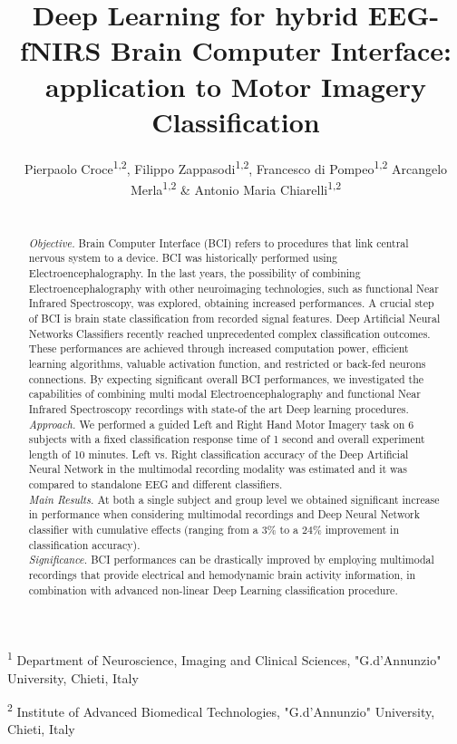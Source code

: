 \documentclass[12pt ]{iopart}
\begin{document}
\title[DNN for EEG-fNIRS BCI]{Deep Learning for  hybrid EEG-fNIRS Brain Computer Interface: application to Motor Imagery Classification}

\author{Pierpaolo Croce\textsuperscript{1,2}, Filippo Zappasodi\textsuperscript{1,2}, Francesco di Pompeo\textsuperscript{1,2} Arcangelo Merla\textsuperscript{1,2} \& Antonio Maria Chiarelli\textsuperscript{1,2}}

\vspace{10pt}
\begin{indented}
\item[] \textsuperscript{1} Department of Neuroscience, Imaging and Clinical Sciences, "G.d’Annunzio" University, Chieti, Italy
\item[] \textsuperscript{2} Institute of Advanced Biomedical Technologies, "G.d’Annunzio" University, Chieti, Italy
\end{indented}

\begin{abstract}
	\\
	\textit{Objective.} Brain Computer Interface (BCI) refers to procedures that link central nervous system to a device.  BCI was historically performed using Electroencephalography. In the last years, the possibility of combining Electroencephalography with other neuroimaging technologies, such as functional Near Infrared Spectroscopy, was explored, obtaining increased performances. A crucial step of BCI is brain state classification from recorded signal features. Deep Artificial Neural Networks Classifiers recently reached unprecedented complex classification outcomes. These performances are achieved through increased computation power, efficient learning algorithms, valuable activation function, and restricted or back-fed neurons connections. By expecting significant overall BCI performances, we investigated the capabilities of combining multi modal Electroencephalography and functional Near Infrared Spectroscopy recordings with state-of the art Deep learning procedures.\\
	\textit{Approach.} We performed a guided Left and Right Hand Motor Imagery task on 6 subjects with a fixed classification response time of 1 second and overall experiment length of 10 minutes. Left vs. Right classification accuracy of the Deep Artificial Neural Network in the multimodal recording modality was estimated and it was compared to standalone EEG and different classifiers.\\
	\textit{Main Results.} At both a single subject and group level we obtained significant increase in performance when considering multimodal recordings and Deep Neural Network classifier with cumulative effects (ranging from a $3\%$ to a $24\%$ improvement in classification accuracy).\\
	\textit{Significance.} BCI performances can be drastically improved by employing multimodal recordings that provide electrical and hemodynamic brain activity information, in combination with advanced non-linear Deep Learning classification procedure.
\end{abstract}
\end{document}
